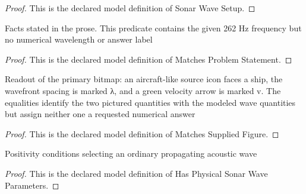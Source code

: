 \begin{proof}
  This is the declared model definition of Sonar Wave Setup.
\end{proof}
\begin{definition}
  \label{def:physics:phyx-mini-0190:phyxminiproblems-problemphyxmini0190-matchesproblemstatement}
  Facts stated in the prose. This predicate contains the given 262 Hz frequency but no numerical wavelength or answer label
\end{definition}
\begin{proof}
  This is the declared model definition of Matches Problem Statement.
\end{proof}
\begin{definition}
  \label{def:physics:phyx-mini-0190:phyxminiproblems-problemphyxmini0190-matchessuppliedfigure}
  Readout of the primary bitmap: an aircraft-like source icon faces a ship, the wavefront spacing is marked λ, and a green velocity arrow is marked v. The equalities identify the two pictured quantities with the modeled wave quantities but assign neither one a requested numerical answer
\end{definition}
\begin{proof}
  This is the declared model definition of Matches Supplied Figure.
\end{proof}
\begin{definition}
  \label{def:physics:phyx-mini-0190:phyxminiproblems-problemphyxmini0190-hasphysicalsonarwaveparameters}
  Positivity conditions selecting an ordinary propagating acoustic wave
\end{definition}
\begin{proof}
  This is the declared model definition of Has Physical Sonar Wave Parameters.
\end{proof}
